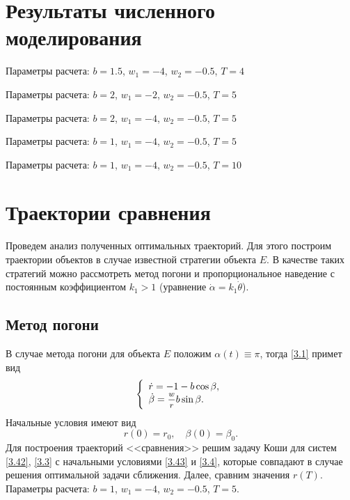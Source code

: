 \documentclass[a4paper,12pt, openany]{book}
\theoremstyle{plain} %
\theoremstyle{definition} %
\theoremstyle{remark} %
\numberwithin{equation}{chapter}
\begin{document}
{\section{Результаты численного моделирования}

Параметры расчета: $b=1.5$, $w_1 = -4$, $w_2 = -0.5$, $T=4$


Параметры расчета: $b=2$, $w_1 = -2$, $w_2 = -0.5$, $T=5$


\newpage
Параметры расчета: $b=2$, $w_1 = -4$, $w_2 = -0.5$, $T=5$


Параметры расчета: $b=1$, $w_1 = -4$, $w_2 = -0.5$, $T=5$



\newpage
Параметры расчета: $b=1$, $w_1 = -4$, $w_2 = -0.5$, $T=10$



\section{Траектории сравнения}

Проведем анализ полученных оптимальных траекторий. Для этого построим траектории объектов в случае известной стратегии объекта $E$. В качестве таких стратегий можно рассмотреть метод погони \cite{Kim} и пропорциональное наведение с постоянным коэффициентом $k_1 > 1$ (уравнение $\dot\alpha = k_1 \dot\theta$). 

\subsection{Метод погони}

В случае метода погони для объекта $E$ положим $\alpha(t) \equiv \pi$, тогда \eqref{3.1} примет вид
\begin{equation}\label{3.42}
\left\{ {\begin{array}{*{20}l}
   {\dot r =  - 1 - b\cos \beta ,} \hfill  \\
   {\dot \beta  = \mfrac{w}
{r}b\sin \beta .} \hfill  \\

 \end{array} } \right.
\end{equation}
Начальные условия имеют вид
\begin{equation}\label{3.43}
r\left( 0 \right) = r_0, \quad \beta \left( 0 \right) = \beta _0 .
\end{equation}
Для построения траекторий <<сравнения>> решим задачу Коши для систем \eqref{3.42}, \eqref{3.3} с начальными условиями \eqref{3.43} и \eqref{3.4}, которые совпадают в случае решения оптимальной задачи сближения. Далее, сравним значения $r(T)$.
\newpage
Параметры расчета: $b=1$, $w_1 = -4$, $w_2 = -0.5$, $T=5$. 




}
\end{document}
